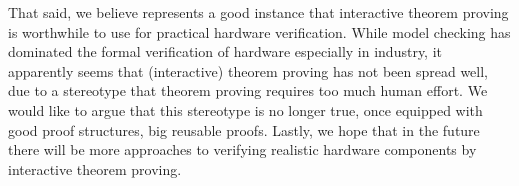 That said, we believe \hemiola{} represents a good instance that interactive theorem proving is worthwhile to use for practical hardware verification.
While model checking has dominated the formal verification of hardware especially in industry, it apparently seems that (interactive) theorem proving has not been spread well, due to a stereotype that theorem proving requires too much human effort.
We would like to argue that this stereotype is no longer true, once equipped with good proof structures, \eg{} big reusable proofs.
Lastly, we hope that in the future there will be more approaches to verifying realistic hardware components by interactive theorem proving.
